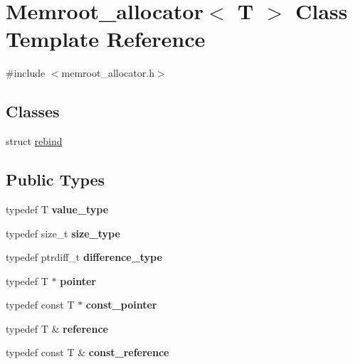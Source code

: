 \hypertarget{classMemroot__allocator}{}\section{Memroot\+\_\+allocator$<$ T $>$ Class Template Reference}
\label{classMemroot__allocator}


{\ttfamily \#include $<$memroot\+\_\+allocator.\+h$>$}

\subsection*{Classes}
\begin{DoxyCompactItemize}
\item 
struct \mbox{\hyperlink{structMemroot__allocator_1_1rebind}{rebind}}
\end{DoxyCompactItemize}
\subsection*{Public Types}
\begin{DoxyCompactItemize}
\item 
\mbox{\label{classMemroot__allocator_a2b1fac76f7bca5287cf2266edb5a05fd}} 
typedef T {\bfseries value\+\_\+type}
\item 
\mbox{\label{classMemroot__allocator_a52126f6b85b3528724612b9134c522dc}} 
typedef size\+\_\+t {\bfseries size\+\_\+type}
\item 
\mbox{\label{classMemroot__allocator_a982371c84d7962a2fb2067846f2c8ef6}} 
typedef ptrdiff\+\_\+t {\bfseries difference\+\_\+type}
\item 
\mbox{\label{classMemroot__allocator_a0edb908fe8edec31eaf42ec89095f1a4}} 
typedef T $\ast$ {\bfseries pointer}
\item 
\mbox{\label{classMemroot__allocator_a3052c982c483a79470df7c1f1e3eb3b9}} 
typedef const T $\ast$ {\bfseries const\+\_\+pointer}
\item 
\mbox{\label{classMemroot__allocator_adb39a398a72605169bf8d9eb1fcd96d2}} 
typedef T \& {\bfseries reference}
\item 
\mbox{\label{classMemroot__allocator_af69968eb8d7e5fdeb0d737a946b5b38a}} 
typedef const T \& {\bfseries const\+\_\+reference}
\end{DoxyCompactItemize}
